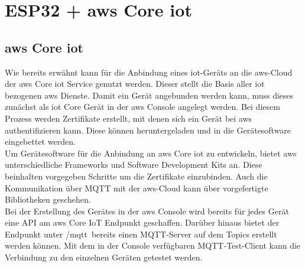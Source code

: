\chapter{ESP32 + \acrshort{aws} Core \acrshort{iot}}\label{ch:5}
\section{\acrshort{aws} Core \acrshort{iot}}\label{sec:5.1}
Wie bereits erwähnt kann für die Anbindung eines \acrshort{iot}-Geräts an die \acrshort{aws}-\Gls{Cloud} der \acrshort{aws} Core \acrshort{iot} Service genutzt werden. Dieser stellt die Basis aller \acrshort{iot} bezogenen \acrshort{aws} Dienste. Damit ein Gerät angebunden werden kann, muss dieses zunächst als \acrshort{iot} Core Gerät in der \acrshort{aws} Console angelegt werden. Bei diesem Prozess werden Zertifikate erstellt, mit denen sich ein Gerät bei \acrshort{aws} authentifizieren kann. Diese können heruntergeladen und in die Gerätesoftware eingebettet werden\cite*[]{AWSIoT}.\\ Um Gerätesoftware für die Anbindung an \acrshort{aws} Core \acrshort{iot} zu entwickeln, bietet \acrshort{aws} unterschiedliche Frameworks und Software Development Kits an. Diese beinhalten vorgegeben Schritte um die Zertifikate einzubinden. Auch die Kommunikation über MQTT mit der \acrshort{aws}-\Gls{Cloud} kann über vorgefertigte Bibliotheken geschehen\cite*[]{AWSSDK}.\\ Bei der Erstellung des Gerätes in der \acrshort{aws} Console wird bereits für jedes Gerät eine API am \acrshort{aws} Core IoT Endpunkt geschaffen. Darüber hinaus bietet der Endpunkt unter \glqq{}/mqtt\grqq\ bereits einen MQTT-Server auf dem \Gls{Topics} erstellt werden können. Mit dem in der Console verfügbaren MQTT-Test-Client kann die Verbindung zu den einzelnen Geräten getestet werden.
